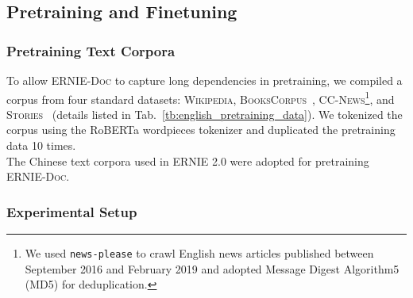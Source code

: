 \documentclass[11pt,a4paper]{article}
\newcommand{\mname}{\textsc{ERNIE-Doc}\xspace}
\begin{document}
\subsection{Pretraining and Finetuning}
\subsubsection{Pretraining Text Corpora}

\begin{table}[!h]
\centering
{}\caption{English datasets used for pretraining.}
\label{tb:english_pretraining_data}
\end{table}

 To allow \mname to capture long dependencies in pretraining, we compiled a corpus from four standard datasets: \textsc{Wikipedia}, \textsc{BooksCorpus}~\citep{zhu2015aligning}, \textsc{CC-News}\footnote{We used \texttt{news-please} to crawl English news articles published between September 2016 and February 2019 and adopted 
Message Digest Algorithm5 (MD5) for deduplication.}, and \textsc{Stories}~\citep{trinh2018simple} (details listed in Tab.~\ref{tb:english_pretraining_data}). We tokenized the corpus using the RoBERTa wordpieces tokenizer \citep{liu2019roberta} and duplicated the pretraining data 10 times.  
\\ 
 The Chinese text corpora used in ERNIE 2.0 \citep{sun2020ernie} were adopted for pretraining \mname.

\subsubsection{Experimental Setup} 
\end{document}
